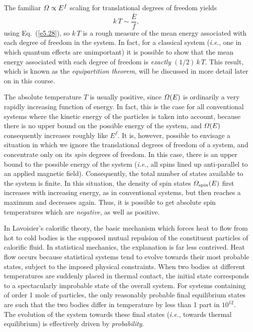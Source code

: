 The familiar ${\mit\Omega} \propto E^f$ scaling for translational degrees of freedom yields
\begin{equation}
k\,T \sim \frac{\bar{E}}{f},
\end{equation}
using Eq.~(\ref{e5.28}),
so $k\,T$ is a rough measure of the mean energy  associated with
each degree of freedom in the system. In fact, for a classical system ({\em i.e.},
one in which
quantum effects are unimportant) it is possible to show that the mean energy 
associated with each degree of freedom is
 {\em exactly}\/ $(1/2)\,k\,T$. This result, which is known as the
 {\em equipartition theorem}, will be discussed
in more detail later on in this course. 

The absolute 
temperature $T$ is usually positive,
since ${\mit\Omega}(E)$ is ordinarily a very rapidly increasing function of 
 energy.
In fact, this is the case for all conventional systems
where the kinetic energy of the particles is taken into account, because there is
no upper bound on the possible energy of the system,
and ${\mit\Omega}(E)$ consequently increases
roughly like $E^f$. It is, however, possible to envisage a situation in which we
ignore the translational degrees of freedom of a system, and concentrate only
on its {\em spin}\/ degrees of freedom. In this case, there is an upper bound to
the possible energy of the system ({\em i.e.}, all spins lined up anti-parallel to
an applied magnetic field). Consequently, the total number of states available to
the system is finite. In this situation, the density of spin states
${\mit\Omega}_{\rm spin}(E)$ first increases with increasing energy, as in conventional
systems, but then reaches a maximum and decreases again. Thus, it is possible to
get absolute spin temperatures which are {\em negative}, as well as positive.

In Lavoisier's calorific theory, the basic mechanism which forces heat
to flow from hot to cold bodies is the supposed mutual repulsion of the constituent
particles of calorific fluid. In statistical mechanics,
the explanation is far less contrived. Heat flow occurs
 because  statistical systems tend to evolve towards their most
probable states, subject to the imposed physical constraints.
When two bodies at different temperatures are suddenly
placed in thermal contact, the initial state
corresponds to a spectacularly improbable state of the overall system. For systems
containing of order 1 mole of particles, the only reasonably probable final 
equilibrium 
states are such that the two bodies differ in temperature by less than 1 part in $10^{12}$.
The evolution of the system towards these final states
({\em i.e.}, towards thermal equilibrium) is effectively driven by
{\em probability}. 

